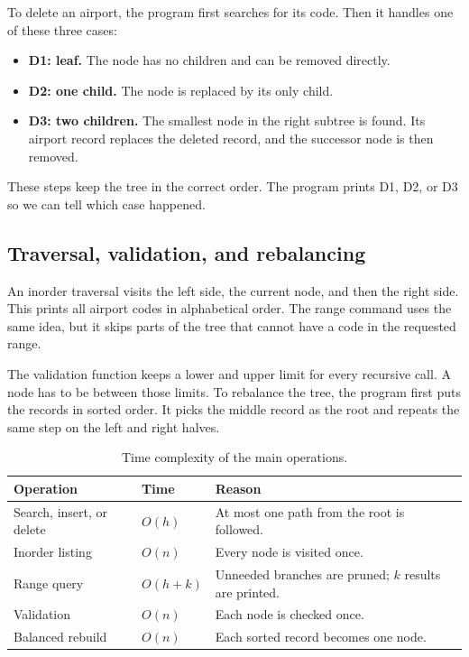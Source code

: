 \documentclass[12pt]{article}
\begin{document}
To delete an airport, the program first searches for its code. Then it handles one of these three cases:

\begin{itemize}
    \item \textbf{D1: leaf.} The node has no children and can be removed directly.
    \item \textbf{D2: one child.} The node is replaced by its only child.
    \item \textbf{D3: two children.} The smallest node in the right subtree is found. Its airport record replaces the deleted record, and the successor node is then removed.
\end{itemize}

These steps keep the tree in the correct order. The program prints D1, D2, or D3 so we can tell which case happened.

\subsection{Traversal, validation, and rebalancing}

An inorder traversal visits the left side, the current node, and then the right side. This prints all airport codes in alphabetical order. The range command uses the same idea, but it skips parts of the tree that cannot have a code in the requested range.

The validation function keeps a lower and upper limit for every recursive call. A node has to be between those limits. To rebalance the tree, the program first puts the records in sorted order. It picks the middle record as the root and repeats the same step on the left and right halves.

\begin{table}[H]
\centering
\caption{Time complexity of the main operations.}
\begin{tabular}{@{}p{}p{}>{\raggedright\arraybackslash}p{}@{}}
\toprule
\textbf{Operation} & \textbf{Time} & \textbf{Reason} \\
\midrule
Search, insert, or delete & $O(h)$ & At most one path from the root is followed. \\
Inorder listing & $O(n)$ & Every node is visited once. \\
Range query & $O(h+k)$ & Unneeded branches are pruned; $k$ results are printed. \\
Validation & $O(n)$ & Each node is checked once. \\
Balanced rebuild & $O(n)$ & Each sorted record becomes one node. \\
\bottomrule
\end{tabular}
\end{table}
\end{document}
